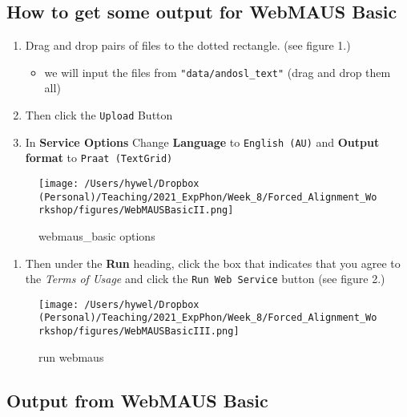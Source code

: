 \documentclass[
  11pt,
]{article}
\providecommand{\tightlist}{%
  \setlength{\itemsep}{0pt}\setlength{\parskip}{0pt}}
\begin{document}
\hypertarget{how-to-get-some-output-for-webmaus-basic}{%
\subsection{How to get some output for WebMAUS
Basic}\label{how-to-get-some-output-for-webmaus-basic}}

\begin{enumerate}
\def\labelenumi{\arabic{enumi}.}
\item
  Drag and drop pairs of files to the dotted rectangle. (see figure 1.)

  \begin{itemize}
  \tightlist
  \item
    we will input the files from \texttt{"data/andosl\_text"} (drag and
    drop them all)
  \end{itemize}
\item
  Then click the \texttt{Upload} Button
\item
  In \textbf{Service Options} Change \textbf{Language} to
  \texttt{English\ (AU)} and \textbf{Output format} to
  \texttt{Praat\ (TextGrid)}
\end{enumerate}

\begin{figure}
\centering
\texttt{[image: /Users/hywel/Dropbox (Personal)/Teaching/2021\_ExpPhon/Week\_8/Forced\_Alignment\_Workshop/figures/WebMAUSBasicII.png]}
\caption{webmaus\_basic options}
\end{figure}

\begin{enumerate}
\def\labelenumi{\arabic{enumi}.}
\setcounter{enumi}{3}
\tightlist
\item
  Then under the \textbf{Run} heading, click the box that indicates that
  you agree to the \emph{Terms of Usage} and click the
  \texttt{Run\ Web\ Service} button (see figure 2.)
\end{enumerate}

\begin{figure}
\centering
\texttt{[image: /Users/hywel/Dropbox (Personal)/Teaching/2021\_ExpPhon/Week\_8/Forced\_Alignment\_Workshop/figures/WebMAUSBasicIII.png]}
\caption{run webmaus}
\end{figure}

\hypertarget{output-from-webmaus-basic}{%
\subsection{Output from WebMAUS Basic}\label{output-from-webmaus-basic}}
\end{document}
